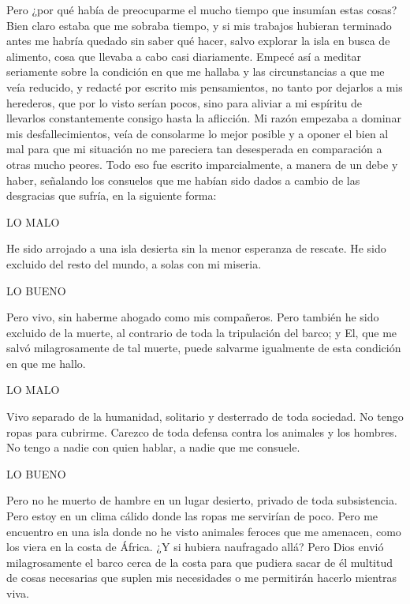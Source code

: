 \documentclass{novela}
\begin{document}
    Pero ¿por qué había de preocuparme el mucho tiempo que insumían estas cosas? Bien claro estaba que me sobraba tiempo, y si mis trabajos hubieran terminado antes me habría quedado sin saber qué hacer, salvo explorar la isla en busca de alimento, cosa que llevaba a cabo casi diariamente.
    Empecé así a meditar seriamente sobre la condición en que me hallaba y las circunstancias a que me veía reducido, y redacté por escrito mis pensamientos, no tanto por dejarlos a mis herederos, que por lo visto serían pocos, sino para aliviar a mi espíritu de llevarlos constantemente consigo hasta la aflicción. Mi razón empezaba a dominar mis desfallecimientos, veía de consolarme lo mejor posible y a oponer el bien al mal para que mi situación no me pareciera tan desesperada en comparación a otras mucho peores. Todo eso fue escrito imparcialmente, a manera de un debe y haber, señalando los consuelos que me habían sido dados a cambio de las desgracias que sufría, en la siguiente forma:





LO MALO

He sido arrojado a una isla desierta sin la menor esperanza de rescate.
He sido excluido del resto del mundo, a solas con mi miseria.








LO BUENO

Pero vivo, sin haberme ahogado como mis compañeros.
Pero también he sido excluido de la muerte, al contrario de toda la tripulación del barco; y El, que me salvó milagrosamente de tal muerte, puede salvarme igualmente de esta condición en que me hallo.

LO MALO

Vivo separado de la humanidad, solitario y desterrado de toda sociedad. No tengo ropas para cubrirme.
Carezco de toda defensa contra los animales y los hombres.
No tengo a nadie con quien hablar, a nadie que me consuele.













LO BUENO

Pero no he muerto de hambre en un lugar desierto, privado de toda subsistencia.
Pero estoy en un clima cálido donde las ropas me servirían de poco.
Pero me encuentro en una isla donde no he visto animales feroces que me amenacen, como los viera en la costa de África. ¿Y si hubiera naufragado allá? Pero Dios envió milagrosamente el barco cerca de la costa para que pudiera sacar de él multitud de cosas necesarias que suplen mis necesidades o me permitirán hacerlo mientras viva.
\end{document}
